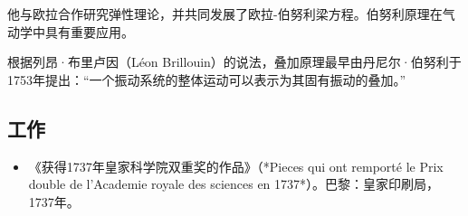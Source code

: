 他与欧拉合作研究弹性理论，并共同发展了欧拉-伯努利梁方程。伯努利原理在气动学中具有重要应用。

根据列昂·布里卢因（Léon Brillouin）的说法，叠加原理最早由丹尼尔·伯努利于1753年提出：“一个振动系统的整体运动可以表示为其固有振动的叠加。”
\subsection{工作}
\begin{itemize}
\item 《获得1737年皇家科学院双重奖的作品》（*Pieces qui ont remporté le Prix double de l'Academie royale des sciences en 1737*）。巴黎：皇家印刷局，1737年。
\end{itemize}